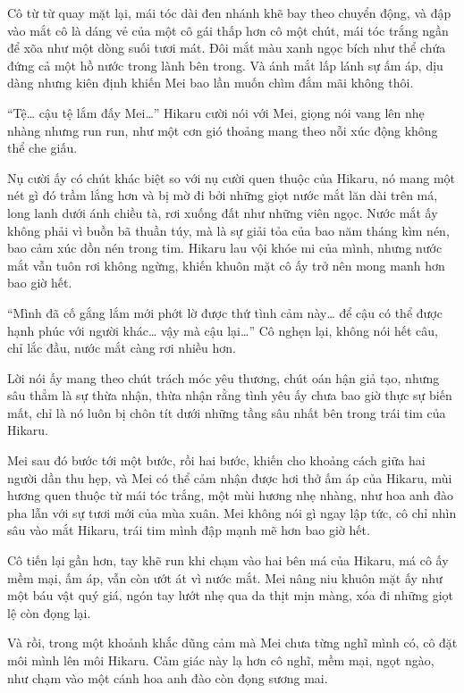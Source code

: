 {Cô từ từ quay mặt lại, mái tóc dài đen nhánh khẽ bay theo chuyển động,
và đập vào mắt cô là dáng vẻ của một cô gái thấp hơn cô một chút, mái
tóc trắng ngần để xõa như một dòng suối tươi mát. Đôi mắt màu xanh ngọc
bích như thể chứa đứng cả một hồ nước trong lành bên trong. Và ánh mắt
lấp lánh sự ấm áp, dịu dàng nhưng kiên định khiến Mei bao lần muốn chìm
đắm mãi không thôi.

``Tệ\ldots{} cậu tệ lắm đấy Mei\ldots'' Hikaru cười nói với Mei, giọng
nói vang lên nhẹ nhàng nhưng run run, như một cơn gió thoảng mang theo
nỗi xúc động không thể che giấu.

Nụ cười ấy có chút khác biệt so với nụ cười quen thuộc của Hikaru, nó
mang một nét gì đó trầm lắng hơn và bị mờ đi bởi những giọt nước mắt lăn
dài trên má, long lanh dưới ánh chiều tà, rơi xuống đất như những viên
ngọc. Nước mắt ấy không phải vì buồn bã thuần túy, mà là sự giải tỏa của
bao năm tháng kìm nén, bao cảm xúc dồn nén trong tim. Hikaru lau vội
khóe mi của mình, nhưng nước mắt vẫn tuôn rơi không ngừng, khiến khuôn
mặt cô ấy trở nên mong manh hơn bao giờ hết.

``Mình đã cố gắng lắm mới phớt lờ được thứ tình cảm này\ldots{} để cậu
có thể được hạnh phúc với người khác\ldots{} vậy mà cậu lại\ldots'' Cô
nghẹn lại, không nói hết câu, chỉ lắc đầu, nước mắt càng rơi nhiều hơn.

Lời nói ấy mang theo chút trách móc yêu thương, chút oán hận giả tạo,
nhưng sâu thẳm là sự thừa nhận, thừa nhận rằng tình yêu ấy chưa bao giờ
thực sự biến mất, chỉ là nó luôn bị chôn tít dưới những tầng sâu nhất
bên trong trái tim của Hikaru.

Mei sau đó bước tới một bước, rồi hai bước, khiến cho khoảng cách giữa
hai người dần thu hẹp, và Mei có thể cảm nhận được hơi thở ấm áp của
Hikaru, mùi hương quen thuộc từ mái tóc trắng, một mùi hương nhẹ nhàng,
như hoa anh đào pha lẫn với sự tươi mới của mùa xuân. Mei không nói gì
ngay lập tức, cô chỉ nhìn sâu vào mắt Hikaru, trái tim mình đập mạnh mẽ
hơn bao giờ hết.

Cô tiến lại gần hơn, tay khẽ run khi chạm vào hai bên má của Hikaru, má
cô ấy mềm mại, ấm áp, vẫn còn ướt át vì nước mắt. Mei nâng niu khuôn mặt
ấy như một báu vật quý giá, ngón tay lướt nhẹ qua da thịt mịn màng, xóa
đi những giọt lệ còn đọng lại.

Và rồi, trong một khoảnh khắc dũng cảm mà Mei chưa từng nghĩ mình có, cô
đặt môi mình lên môi Hikaru. Cảm giác này lạ hơn cô nghĩ, mềm mại, ngọt
ngào, như chạm vào một cánh hoa anh đào còn đọng sương mai.

}
